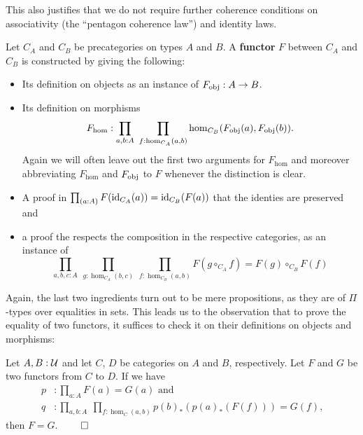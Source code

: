 This also justifies that we do not require further coherence conditions on
associativity (the ``pentagon coherence law'') and identity laws. %

\begin{defn} [Functors] \label{def:hott-precat-functor}
Let $C_A$ and $C_B$ be precategories on types $A$ and $B$.
A \textbf{functor} $F$ between $C_A$ and $C_B$ is constructed by giving the following:
\begin{itemize}
\item Its definition on objects as an instance of $F_{\operatorname{obj}}: A \to B$.
\item Its definition on morphisms
\begin{equation*}
F_{\hom} : \prod_{a,b:A} ~ \prod_{f:\hom_{C_A}(a,b)} \hom_{C_B}(F_{\operatorname{obj}}(a),F_{\operatorname{obj}}(b))\text{.}
\end{equation*}
Again we will often leave out the first two arguments for $F_{\hom}$ and moreover
abbreviating $F_{\hom}$ and $F_{\operatorname{obj}}$ to $F$ whenever the distinction is clear.
\item A proof in $\prod_{(a:A)} F(\operatorname{id}_{C_A}(a)) = \operatorname{id}_{C_B}(F(a))$ that the identies
are preserved and
\item a proof the respects the composition in the respective categories, as an instance
of
\begin{equation*}
\prod_{a,b,c:A} ~ \prod_{g:\hom_{C_A}(b,c)} ~ \prod_{f:\hom_{C_B}(a,b)}
F(g \circ_{C_A} f) = F(g) \circ_{C_B} F(f)
\end{equation*}
\end{itemize}
\end{defn}

Again, the last two ingredients turn out to be mere propositions, as they are
of $\Pi$-types over equalities in sets.
This leads us to the observation that to prove the equality of two functors, it
suffices to check it on their definitions on objects and morphisms:

\begin{lemma}
Let $A, B : \mathcal{U}$ and let $C$, $D$ be categories on $A$ and $B$, respectively.
Let $F$ and $G$ be two functors from $C$ to $D$. If we have
\begin{align*}
p &: \prod_{a:A} F(a) = G(a) \text{ and } \\
q &: \prod_{a,b:A} ~ \prod_{f : \hom_C(a,b)} p(b)_*\left(p(a)_*(F(f))\right) = G(f) \text{,}
\end{align*}
then $F = G$. \hfill $\qed$
\end{lemma}

